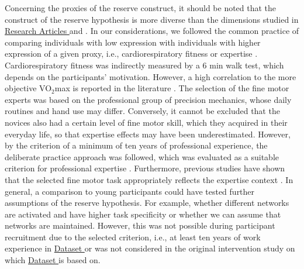 Concerning the proxies of the reserve construct, it should be noted that the construct of the reserve hypothesis is more diverse than the dimensions studied in \hyperref[results:paperI]{Research Articles } and \hyperref[results:paperI]{}. In our considerations, we followed the common practice of comparing individuals with low expression with individuals with higher expression of a given proxy, i.e., cardiorespiratory fitness or expertise \cite{Koen2019}. Cardiorespiratory fitness was indirectly measured by a 6 min walk test, which depends on the participants' motivation. However, a high correlation to the more objective VO$_2$max is reported in the literature \cite{Zhang2017}. The selection of the fine motor experts was based on the professional group of precision mechanics, whose daily routines and hand use may differ. Conversely, it cannot be excluded that the novices also had a certain level of fine motor skill, which they acquired in their everyday life, so that expertise effects may have been underestimated. However, by the criterion of a minimum of ten years of professional experience, the deliberate practice approach was followed, which was evaluated as a suitable criterion for professional expertise \cite{Ericsson1991, Voelcker-Rehage2013}. Furthermore, previous studies have shown that the selected fine motor task appropriately reflects the expertise context \cite{Vieluf2018, Goelz2018, Vieluf2012, Vieluf2013}. In general, a comparison to young participants could have tested further assumptions of the reserve hypothesis. For example, whether different networks are activated and have higher task specificity or whether we can assume that networks are maintained. However, this was not possible during participant recruitment due to the selected criterion, i.e., at least ten years of work experience in \hyperref[methods:datasets:I]{Dataset } or was not considered in the original intervention study on which \hyperref[methods:datasets:III]{Dataset } is based on.\\
